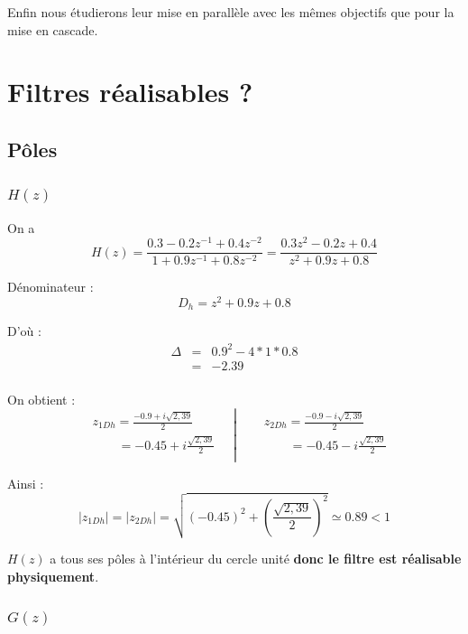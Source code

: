 \documentclass[12,french]{report}
\begin{document}
Enfin nous étudierons leur mise en parallèle avec les mêmes objectifs que pour la mise en cascade.


\chapter{Filtres réalisables ?}

\section{Pôles}

\subsection{$H(z)$}

\vspace{0.25cm}

On a $$ H(z) = \frac{0.3-0.2z^{-1}+0.4z^{-2}}{1+0.9z^{-1}+0.8z^{-2}} = \frac{0.3z^2-0.2z+0.4}{z^2+0.9z+0.8} $$

Dénominateur : $$ D_h= z^2+0.9z+0.8 $$

D'où : $$ \begin{array}{ccl}
\Delta & = & 0.9^2-4*1*0.8 \\
	   & = & -2.39 \\
\end{array} $$

On obtient :
$$\left.\begin{aligned}
	&z_{1Dh} = \frac{-0.9+i\sqrt{2,39}}{2} \\
	&\quad\quad = -0.45 + i\frac{\sqrt{2,39}}{2} \\
\end{aligned}\quad\right|
\quad\left.\begin{aligned}
	&z_{2Dh} = \frac{-0.9-i\sqrt{2,39}}{2}\\
	&\quad\quad = -0.45 - i\frac{\sqrt{2,39}}{2} \\
\end{aligned}\right.$$

Ainsi :
$$ |z_{1Dh}|=|z_{2Dh}|=\sqrt{(-0.45)^2+\left(\frac{\sqrt{2,39}}{2}\right)^2} \simeq 0.89 < 1 $$


$H(z)$ a tous ses pôles à l'intérieur du cercle unité \textbf{donc le filtre est réalisable physiquement}.\\

\subsection{$G(z)$}
\end{document}

